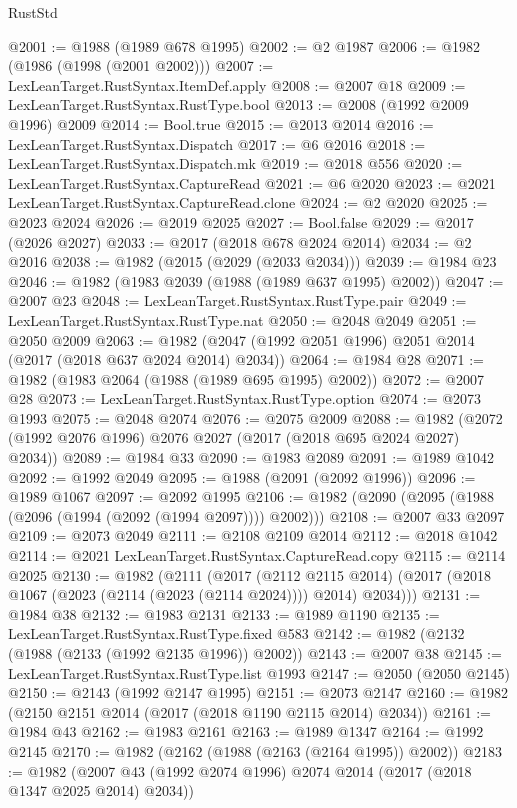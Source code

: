 \begin{lexlean}{RustStd}
\begin{coremodule}
{\begin{coremodule}
{{{{{{{{{{{{{{{{{{{{{{{{{{{{{{{{{{{{{{{{{{{{{{{{{{{{{{@2001 := @1988 (@1989 @678 @1995)
@2002 := @2 @1987
@2006 := @1982 (@1986 (@1998 (@2001 @2002)))
@2007 := LexLeanTarget.RustSyntax.ItemDef.apply
@2008 := @2007 @18
@2009 := LexLeanTarget.RustSyntax.RustType.bool
@2013 := @2008 (@1992 @2009 @1996) @2009
@2014 := Bool.true
@2015 := @2013 @2014
@2016 := LexLeanTarget.RustSyntax.Dispatch
@2017 := @6 @2016
@2018 := LexLeanTarget.RustSyntax.Dispatch.mk
@2019 := @2018 @556
@2020 := LexLeanTarget.RustSyntax.CaptureRead
@2021 := @6 @2020
@2023 := @2021 LexLeanTarget.RustSyntax.CaptureRead.clone
@2024 := @2 @2020
@2025 := @2023 @2024
@2026 := @2019 @2025
@2027 := Bool.false
@2029 := @2017 (@2026 @2027)
@2033 := @2017 (@2018 @678 @2024 @2014)
@2034 := @2 @2016
@2038 := @1982 (@2015 (@2029 (@2033 @2034)))
@2039 := @1984 @23
@2046 := @1982 (@1983 @2039 (@1988 (@1989 @637 @1995) @2002))
@2047 := @2007 @23
@2048 := LexLeanTarget.RustSyntax.RustType.pair
@2049 := LexLeanTarget.RustSyntax.RustType.nat
@2050 := @2048 @2049
@2051 := @2050 @2009
@2063 := @1982 (@2047 (@1992 @2051 @1996) @2051 @2014 (@2017 (@2018 @637 @2024 @2014) @2034))
@2064 := @1984 @28
@2071 := @1982 (@1983 @2064 (@1988 (@1989 @695 @1995) @2002))
@2072 := @2007 @28
@2073 := LexLeanTarget.RustSyntax.RustType.option
@2074 := @2073 @1993
@2075 := @2048 @2074
@2076 := @2075 @2009
@2088 := @1982 (@2072 (@1992 @2076 @1996) @2076 @2027 (@2017 (@2018 @695 @2024 @2027) @2034))
@2089 := @1984 @33
@2090 := @1983 @2089
@2091 := @1989 @1042
@2092 := @1992 @2049
@2095 := @1988 (@2091 (@2092 @1996))
@2096 := @1989 @1067
@2097 := @2092 @1995
@2106 := @1982 (@2090 (@2095 (@1988 (@2096 (@1994 (@2092 (@1994 @2097)))) @2002)))
@2108 := @2007 @33 @2097
@2109 := @2073 @2049
@2111 := @2108 @2109 @2014
@2112 := @2018 @1042
@2114 := @2021 LexLeanTarget.RustSyntax.CaptureRead.copy
@2115 := @2114 @2025
@2130 := @1982
    (@2111
      (@2017
        (@2112 @2115 @2014)
        (@2017 (@2018 @1067 (@2023 (@2114 (@2023 (@2114 @2024)))) @2014) @2034)))
@2131 := @1984 @38
@2132 := @1983 @2131
@2133 := @1989 @1190
@2135 := LexLeanTarget.RustSyntax.RustType.fixed @583
@2142 := @1982 (@2132 (@1988 (@2133 (@1992 @2135 @1996)) @2002))
@2143 := @2007 @38
@2145 := LexLeanTarget.RustSyntax.RustType.list @1993
@2147 := @2050 (@2050 @2145)
@2150 := @2143 (@1992 @2147 @1995)
@2151 := @2073 @2147
@2160 := @1982 (@2150 @2151 @2014 (@2017 (@2018 @1190 @2115 @2014) @2034))
@2161 := @1984 @43
@2162 := @1983 @2161
@2163 := @1989 @1347
@2164 := @1992 @2145
@2170 := @1982 (@2162 (@1988 (@2163 (@2164 @1995)) @2002))
@2183 := @1982 (@2007 @43 (@1992 @2074 @1996) @2074 @2014 (@2017 (@2018 @1347 @2025 @2014) @2034))
}}}}}}}}}}}}}}}}}}}}}}}}}}}}}}}}}}}}}}}}}}}}}}}}}}}}}}
\end{coremodule}}
\end{coremodule}
\end{lexlean}
